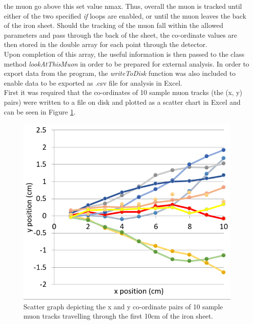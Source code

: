 \documentclass[twocolumn]{article}
\begin{document}
the muon go above this set value nmax. Thus, overall the muon is tracked until either of the two specified \textit{if} loops are enabled, or until the muon leaves the back of the iron sheet. Should the tracking of the muon fall within the allowed parameters and pass through the back of the sheet, the co-ordinate values are then stored in the double array for each point through the detector. \\\indent Upon completion of this array, the useful information is then passed to the class method \textit{lookAtThisMuon} in order to be prepared for external analysis.   In order to export data from the program, the \textit{writeToDisk} function was also included to enable data to be exported as .csv file for analysis in Excel. \\\indent First it was required that the co-ordinates of 10 sample muon tracks (the (x, y) pairs) were written to a file on disk and plotted as a scatter chart in Excel and can be seen in Figure \ref{graph1}.
\begin{figure}[h]
	\includegraphics[scale=0.3]{Images/Graph1.png}
	\caption{\label{graph1}Scatter graph depicting the x and y co-ordinate pairs of 10 sample muon tracks travelling through the first 10cm of the iron sheet.}
\end{figure}
\end{document}
